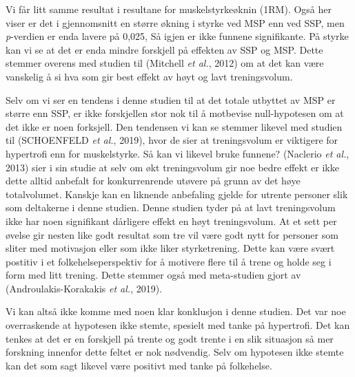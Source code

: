\documentclass[
  letterpaper,
  DIV=11,
  numbers=noendperiod]{scrreprt}
\begin{document}
Vi får litt samme resultat i resultane for muskelstyrkeøknin (1RM). Også
her viser er det i gjennomsnitt en større økning i styrke ved MSP enn
ved SSP, men \emph{p}-verdien er enda lavere på 0,025, Så igjen er ikke
funnene signifikante. På styrke kan vi se at det er enda mindre
forskjell på effekten av SSP og MSP. Dette stemmer overens med studien
til (Mitchell \emph{et al.}, 2012) om at det kan være vanskelig å si hva
som gir best effekt av høyt og lavt treningsvolum.

Selv om vi ser en tendens i denne studien til at det totale utbyttet av
MSP er større enn SSP, er ikke forskjellen stor nok til å motbevise
null-hypotesen om at det ikke er noen forksjell. Den tendensen vi kan se
stemmer likevel med studien til (SCHOENFELD \emph{et al.}, 2019), hvor
de sier at treningsvolum er viktigere for hypertrofi enn for
muskelstyrke. Så kan vi likevel bruke funnene? (Naclerio \emph{et al.},
2013) sier i sin studie at selv om økt treningsvolum gir noe bedre
effekt er ikke dette alltid anbefalt for konkurrenrende utøvere på grunn
av det høye totalvolumet. Kanskje kan en liknende anbefaling gjelde for
utrente personer slik som deltakerne i denne studien. Denne studien
tyder på at lavt treningsvolum ikke har noen signifikant dårligere
effekt en høyt treningsvolum. At et sett per øvelse gir nesten like godt
resultat som tre vil være godt nytt for personer som sliter med
motivasjon eller som ikke liker styrketrening. Dette kan være svært
postitiv i et folkehelseperspektiv for å motivere flere til å trene og
holde seg i form med litt trening. Dette stemmer også med meta-studien
gjort av (Androulakis-Korakakis \emph{et al.}, 2019).

Vi kan altså ikke komme med noen klar konklusjon i denne studien. Det
var noe overraskende at hypotesen ikke stemte, spesielt med tanke på
hypertrofi. Det kan tenkes at det er en forskjell på trente og godt
trente i en slik situasjon så mer forskning innenfor dette feltet er nok
nødvendig. Selv om hypotesen ikke stemte kan det som sagt likevel være
positivt med tanke på folkehelse.


\chapter{}\label{section}


\chapter{}\label{section-1}
\end{document}
